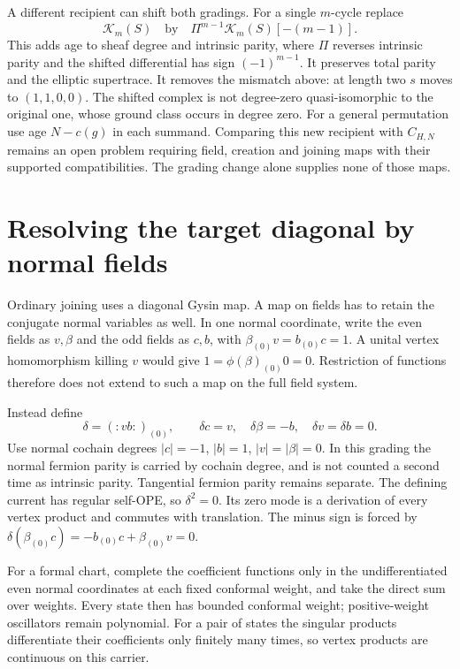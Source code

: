 A different recipient can shift both gradings.
For a single $m$-cycle replace
\begin{equation}\label{cyprim:eq:age-shift}
 \mathcal K_m(S)\quad\text{by}\quad
       \Pi^{m-1}\mathcal K_m(S)[-(m-1)].
\end{equation}
This adds age to sheaf degree and intrinsic parity,
where $\Pi$ reverses intrinsic parity and the shifted
differential has sign $(-1)^{m-1}$. It preserves total
parity and the elliptic supertrace.
It removes the mismatch above: at length two $s$
moves to $(1,1,0,0)$. The shifted complex is not
degree-zero quasi-isomorphic to the original one,
whose ground class occurs in degree zero.
For a general permutation use age $N-c(g)$ in
each summand. Comparing this new recipient with
$C_{H,N}$ remains an open problem requiring field,
creation and joining maps with their supported
compatibilities. The grading change alone supplies
none of those maps.

\section{Resolving the target diagonal by normal fields}
\label{cyprim:sec:normal-diagonal}

Ordinary joining uses a diagonal Gysin map. A map
on fields has to retain the conjugate normal
variables as well. In one normal coordinate,
write the even fields as $v,\beta$ and the odd
fields as $c,b$, with
$\beta_{(0)}v=b_{(0)}c=1$.
A unital vertex homomorphism killing $v$ would
give $1=\phi(\beta)_{(0)}0=0$. Restriction of
functions therefore does not extend to such a
map on the full field system.

Instead define
\begin{equation}\label{cyprim:eq:normal-differential}
 \delta=(:vb:)_{(0)},
 \qquad \delta c=v,\quad\delta\beta=-b,\quad
 \delta v=\delta b=0.
\end{equation}
Use normal cochain degrees $|c|=-1$, $|b|=1$,
$|v|=|\beta|=0$. In this grading the normal
fermion parity is carried by cochain degree,
and is not counted a second time as intrinsic
parity. Tangential fermion parity remains
separate. The defining current has regular
self-OPE, so $\delta^2=0$. Its zero mode is a
derivation of every vertex product and commutes
with translation. The minus sign is forced by
$\delta(\beta_{(0)}c)=-b_{(0)}c+\beta_{(0)}v=0$.

For a formal chart, complete the coefficient
functions only in the undifferentiated even
normal coordinates at each fixed conformal
weight, and take the direct sum over weights.
Every state then has bounded conformal weight;
positive-weight oscillators remain polynomial.
For a pair of states the singular products
differentiate their coefficients only finitely
many times, so vertex products are continuous
on this carrier.

